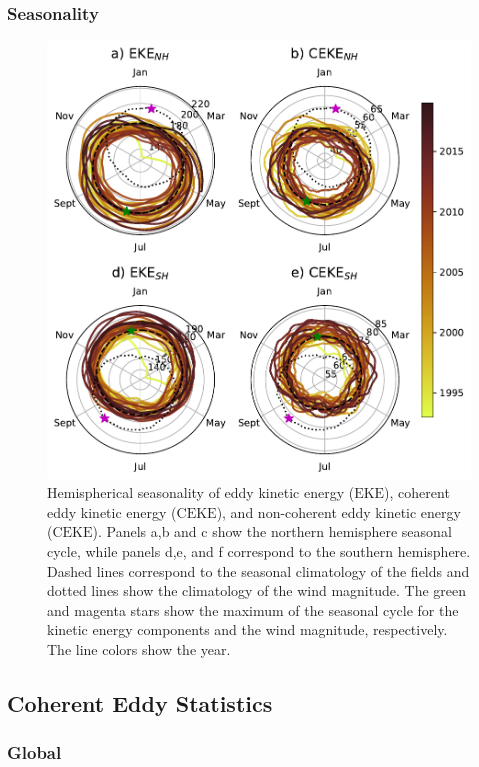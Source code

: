 \documentclass[draft,linenumbers]{agujournal2019}
\newcommand{\EKE}{\textrm{EKE}}
\newcommand{\CEKE}{\textrm{CEKE}}
\begin{document}
	\subsubsection{Seasonality}

	\begin{figure}
	    \centering
	    \includegraphics[width=1\textwidth]{figures/All_polar_plots.pdf}
	    \caption{Hemispherical seasonality of eddy kinetic energy ($\EKE$), coherent eddy kinetic energy ($\CEKE$), and non-coherent eddy kinetic energy ($\CEKE$). Panels a,b and c show the northern hemisphere seasonal cycle, while panels d,e, and f correspond to the southern hemisphere. Dashed lines correspond to the seasonal climatology of the fields and dotted lines show the climatology of the wind magnitude. The green and magenta stars show the maximum of the seasonal cycle for the kinetic energy components and the wind magnitude, respectively. The line colors show the year.}
	    \label{fig:eddy_energy_polar}
	\end{figure}
	
	\subsection{Coherent Eddy Statistics}

	\subsubsection{Global}
	
\end{document}
